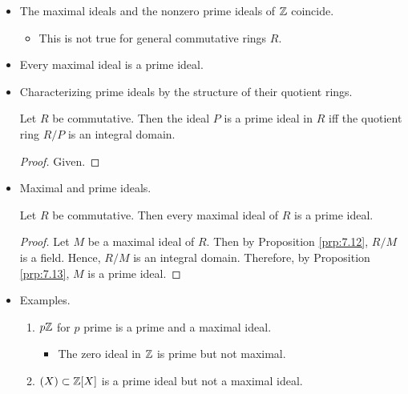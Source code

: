 \documentclass[../notes.tex]{subfiles}
\begin{document}
\begin{itemize}
\begin{itemize}
    \end{itemize}
    \item The maximal ideals and the nonzero prime ideals of $\mathbb{Z}$ coincide.
    \begin{itemize}
        \item This is not true for general commutative rings $R$.
    \end{itemize}
    \item Every maximal ideal is a prime ideal.
    \item Characterizing prime ideals by the structure of their quotient rings.
    \begin{proposition}\label{prp:7.13}
        Let $R$ be commutative. Then the ideal $P$ is a prime ideal in $R$ iff the quotient ring $R/P$ is an integral domain.
        \begin{proof}
            Given.
        \end{proof}
    \end{proposition}
    \item Maximal and prime ideals.
    \begin{corollary}\label{cly:7.14}
        Let $R$ be commutative. Then every maximal ideal of $R$ is a prime ideal.
        \begin{proof}
            Let $M$ be a maximal ideal of $R$. Then by Proposition \ref{prp:7.12}, $R/M$ is a field. Hence, $R/M$ is an integral domain. Therefore, by Proposition \ref{prp:7.13}, $M$ is a prime ideal.
        \end{proof}
    \end{corollary}
    \item Examples.
    \begin{enumerate}
        \item $p\mathbb{Z}$ for $p$ prime is a prime and a maximal ideal.
        \begin{itemize}
            \item The zero ideal in $\mathbb{Z}$ is prime but not maximal.
        \end{itemize}
        \item $(X)\subset\mathbb{Z}[X]$ is a prime ideal but not a maximal ideal.
    \end{enumerate}
\end{itemize}
\end{document}
